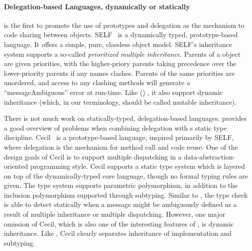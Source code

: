 

\paragraph{Delegation-based Languages, dynamically or statically}

\citet{lieberman1986using} is the first to promote the use of prototypes and
delegation as the mechanism to code sharing between objects.
SELF~\cite{chambers1991parents} is a dynamically typed, prototype-based
language. It offers a simple, pure, classless object model. SELF's inheritance
system supports a so-called \textit{prioritized multiple inheritance}. Parents
of a object are given priorities, with the higher-priory parents taking
precedence over the lower-priority parents if any names clashes. Parents of the
same priorities are unordered, and access to any clashing methods will generate
a ``messageAmbiguous'' error at run-time. Like () \name, it
also support dynamic inheritance (which, in our terminology, should be called
mutable inheritance).

There is not much work on statically-typed, delegation-based languages.
\citet{kniesel1999type} provides a good overview of problems when combining
delegation with s static type discipline. Cecil~\cite{chambers1992object,
  chambers1993cecil} is a prototype-based language, inspired primarily by SELF,
where delegation is the mechanism for method call and code reuse. One of the
design goals of Cecil is to support multiple dispatching in a
data-abstraction-oriented programming style. Cecil supports a static type system
which is layered on top of the dynamically-typed core language, though no formal
typing rules are given. The type system supports parametric polymorphism, in
addition to the inclusion polymorphism supported through subtyping. Similar to
\name, the type check is able to detect statically when a message might be
ambiguously defined as a result of multiple inheritance or multiple dispatching.
However, one major omission of Cecil, which is also one of the interesting
features of \name, is dynamic inheritance. Like \name, Cecil clearly separates
inheritance of implementation and subtyping.

